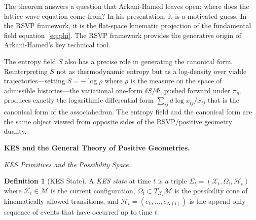 \documentclass[11pt]{article}
\theoremstyle{plain}
\theoremstyle{definition}
\newtheorem{definition}[theorem]{Definition}
\theoremstyle{remark}
\newcommand{\Phif}{\Phi}
\newcommand{\Sf}{S}
\newcommand{\XKS}{\mathcal{X}}
\newcommand{\OmKS}{\Omega}
\newcommand{\HKS}{\mathcal{H}}
\begin{document}
The theorem answers a question that Arkani-Hamed leaves open: where does the lattice wave equation come from? In his presentation, it is a motivated guess. In the RSVP framework, it is the flat-space kinematic projection of the fundamental field equation~\eqref{eq:phi}. The RSVP framework provides the generative origin of Arkani-Hamed's key technical tool.

The entropy field $\Sf$ also has a precise role in generating the canonical form. Reinterpreting $\Sf$ not as thermodynamic entropy but as a log-density over viable trajectories---setting $\Sf = -\log \rho$ where $\rho$ is the measure on the space of admissible histories---the variational one-form $\delta\Sf / \Phif$, pushed forward under $\pi_n$, produces exactly the logarithmic differential form $\sum_{ij} d\log x_{ij} / x_{ij}$ that is the canonical form of the associahedron. The entropy field and the canonical form are the same object viewed from opposite sides of the RSVP/positive geometry duality.

\bigskip\noindent\textbf{KES and the General Theory of Positive Geometries.}
\label{sec:kes}

\medskip\noindent\textit{KES Primitives and the Possibility Space.}

\begin{definition}[KES State]
A \emph{KES state} at time $t$ is a triple $\Sigma_t = (\XKS_t, \OmKS_t, \HKS_t)$ where $\XKS_t \in \mathcal{M}$ is the current configuration, $\OmKS_t \subset T_{\XKS_t}\mathcal{M}$ is the possibility cone of kinematically allowed transitions, and $\HKS_t = (e_1, \ldots, e_{N(t)})$ is the append-only sequence of events that have occurred up to time $t$.
\end{definition}
\end{document}
